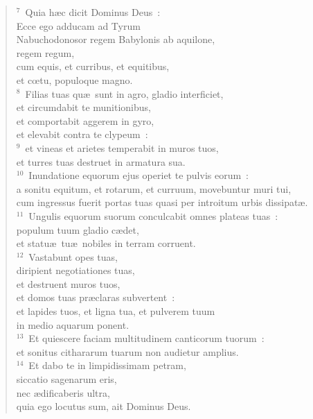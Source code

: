 \begin{flushleft}\begin{verse}${}^{7}$~Quia h\ae c dicit Dominus Deus~:\\ Ecce ego adducam ad Tyrum\\ Nabuchodonosor regem Babylonis ab aquilone,\\ regem regum,\\ cum equis, et curribus, et equitibus,\\ et cœtu, populoque magno.\\
${}^{8}$~Filias tuas qu\ae\ sunt in agro, gladio interficiet,\\ et circumdabit te munitionibus,\\ et comportabit aggerem in gyro,\\ et elevabit contra te clypeum~:\\
${}^{9}$~et vineas et arietes temperabit in muros tuos,\\ et turres tuas destruet in armatura sua.\\
${}^{10}$~Inundatione equorum ejus operiet te pulvis eorum~:\\ a sonitu equitum, et rotarum, et curruum, movebuntur muri tui,\\ cum ingressus fuerit portas tuas quasi per introitum urbis dissipat\ae .\\
${}^{11}$~Ungulis equorum suorum conculcabit omnes plateas tuas~:\\ populum tuum gladio c\ae det,\\ et statu\ae\ tu\ae\ nobiles in terram corruent.\\
${}^{12}$~Vastabunt opes tuas,\\ diripient negotiationes tuas,\\ et destruent muros tuos,\\ et domos tuas pr\ae claras subvertent~:\\ et lapides tuos, et ligna tua, et pulverem tuum\\ in medio aquarum ponent.\\
${}^{13}$~Et quiescere faciam multitudinem canticorum tuorum~:\\ et sonitus cithararum tuarum non audietur amplius.\\
${}^{14}$~Et dabo te in limpidissimam petram,\\ siccatio sagenarum eris,\\ nec \ae dificaberis ultra,\\ quia ego locutus sum, ait Dominus Deus.\\

\end{verse}
\end{flushleft}
